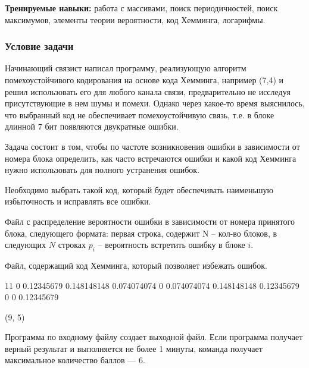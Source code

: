 
\textbf{Тренируемые навыки: }работа с массивами, поиск периодичностей, поиск максимумов, элементы теории вероятности, код Хемминга, логарифмы.

\subsubsection*{Условие задачи}

Начинающий связист написал программу, реализующую алгоритм помехоустойчивого кодирования на основе кода Хемминга, например (7,4) и решил использовать его для любого канала связи, предварительно не исследуя присутствующие в нем шумы и помехи. Однако через какое-то время выяснилось, что выбранный код не обеспечивает помехоустойчивую связь, т.е. в блоке длинной 7 бит появляются двукратные ошибки. 

Задача состоит в том, чтобы по частоте возникновения ошибки в зависимости от номера блока определить, как часто встречаются ошибки и какой код Хемминга нужно использовать для полного устранения ошибок. 

Необходимо выбрать такой код, который будет обеспечивать наименьшую избыточность и исправлять все ошибки.


Файл с распределение вероятности ошибки в зависимости от номера принятого блока, следующего формата: первая строка, содержит N – кол-во блоков, в следующих $N$ строках $p_i$ – вероятность встретить ошибку в блоке $i$.

\outputfmtSection

Файл, содержащий код Хемминга, который позволяет избежать ошибок.


\begin{myverbbox}[\small]{\vinput}
    11
    0
    0.12345679
    0.148148148
    0.074074074
    0
    0.074074074
    0.148148148
    0.12345679
    0
    0
    0.12345679    
\end{myverbbox}
\begin{myverbbox}[\small]{\voutput}
    (9, 5)
\end{myverbbox}

\markSection

Программа по входному файлу создает выходной файл. Если программа получает верный результат и выполняется не более 1 минуты, команда получает максимальное количество баллов — 6.

